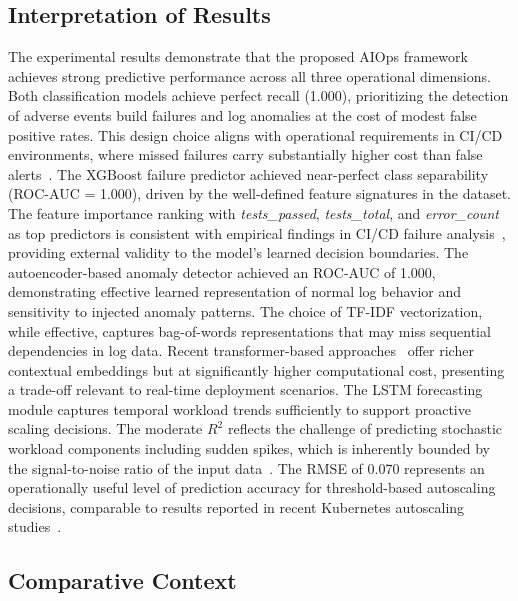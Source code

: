 \documentclass[sn-nature]{sn-jnl}
\theoremstyle{thmstyleone}
\theoremstyle{thmstyletwo}
\theoremstyle{thmstylethree}
\begin{document}
\subsection{Interpretation of Results}\label{subsec:interpretation}

The experimental results demonstrate that the proposed AIOps framework achieves strong predictive performance across all three operational dimensions.
Both classification models achieve perfect recall (1.000), prioritizing the detection of adverse events build failures and log anomalies at the cost of modest false positive rates.
This design choice aligns with operational requirements in CI/CD environments, where missed failures carry substantially higher cost than false alerts~\cite{dang2019aiops}.
The XGBoost failure predictor achieved near-perfect class separability (ROC-AUC = 1.000), driven by the well-defined feature signatures in the dataset.
The feature importance ranking with \textit{tests\_passed}, \textit{tests\_total}, and \textit{error\_count} as top predictors is consistent with empirical findings in CI/CD failure analysis~\cite{rausch2017empirical, beller2017oops}, providing external validity to the model's learned decision boundaries.
The autoencoder-based anomaly detector achieved an ROC-AUC of 1.000, demonstrating effective learned representation of normal log behavior and sensitivity to injected anomaly patterns.
The choice of TF-IDF vectorization, while effective, captures bag-of-words representations that may miss sequential dependencies in log data.
Recent transformer-based approaches~\cite{liao2025logtransformer, zhou2024logllm} offer richer contextual embeddings but at significantly higher computational cost, presenting a trade-off relevant to real-time deployment scenarios.
The LSTM forecasting module captures temporal workload trends sufficiently to support proactive scaling decisions.
The moderate $R^2$ reflects the challenge of predicting stochastic workload components including sudden spikes, which is inherently bounded by the signal-to-noise ratio of the input data~\cite{guruge2025prophet}.
The RMSE of 0.070 represents an operationally useful level of prediction accuracy for threshold-based autoscaling decisions, comparable to results reported in recent Kubernetes autoscaling studies~\cite{dasilva2025adaptive}.

\subsection{Comparative Context}\label{subsec:comparison}
\end{document}
